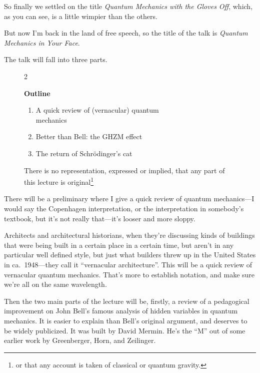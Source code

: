 \documentclass[twocolumn,prb]{revtex4}
\begin{document}
So finally we settled on the title \emph{Quantum Mechanics with the Gloves Off}, which, as you can see, is a little wimpier than the others.

But now I'm back in the land of free speech, so the title of the talk is \emph{Quantum Mechanics in Your Face}.

The talk will fall into three parts.

\begin{figure}[htb] 
\begin{mdframed}
  \vspace{5pt}\hfill 2\\[-18pt]
  \begin{center}
    \textbf{Outline}
  \end{center}
  \begin{raggedright}
  \begin{enumerate}[label=(\arabic*)]
  \item A quick review of (vernacular) quantum \\ mechanics
  \item Better than Bell: the GHZM effect
  \item The return of Schrödinger's cat
  \end{enumerate}
    There is no representation, expressed or implied, that any part of this lecture is original\footnote{or that any account is taken of classical or quantum gravity.}
  \end{raggedright}
  \vspace{6pt}
\end{mdframed}
\end{figure}

There will be a preliminary where I give a quick review of quantum mechanics---I would say %
the Copenhagen interpretation, or the interpretation in somebody's textbook, but it's not really that---it's looser and more sloppy.

Architects and architectural historians, when they're discussing kinds of buildings that were being built in a certain place in a certain time, but aren't in any particular well defined style, but just what builders threw up in the United States in ca.\ 1948---they call it ``vernacular architecture''. This will be a quick review of vernacular quantum mechanics. That's more to establish notation, and make sure we're all on the same wavelength.

Then the two main parts of the lecture will be, firstly, a review of a pedagogical improvement on John Bell's famous analysis of hidden variables in quantum mechanics\cite{bell64physics195,bell66rmp447}. It is easier to explain than Bell's original argument, and deserves to be widely publicized. It was built by David Mermin\cite{mermin90ajp731,mermin90pt9}. He's the ``M'' out of some earlier work by Greenberger, Horn, and Zeilinger\cite{greenberger-89proc,greenberger-90ajp1131}.
\end{document}
